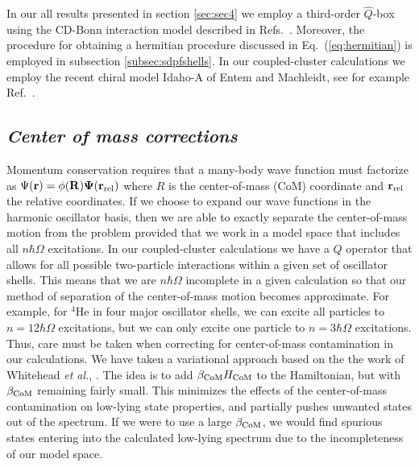 \documentclass{article}
\begin{document}
In our all results presented in section \ref{sec:sec4} we employ a 
third-order $\hat{Q}$-box using the CD-Bonn interaction model described in
Refs.~\cite{cdbonn,cdbonn2000}. Moreover, the procedure for obtaining a
hermitian procedure discussed in Eq.~(\ref{eq:hermitian}) is employed in
subsection \ref{subsec:sdpfshells}. In our coupled-cluster calculations we employ the 
recent chiral model Idaho-A of Entem and Machleidt, see for example Ref.~\cite{machleidt02}. 


\subsection{\it Center of mass corrections}

Momentum conservation requires 
that a many-body wave function must factorize
as $\Psi(\bf{r}) = \phi(R)\Psi(\bf{r}_{\rm rel})$ where 
$R$ is the center-of-mass (CoM) coordinate and $\bf{r}_{\rm rel}$ the 
relative coordinates. If we choose to expand our wave functions in
the harmonic oscillator basis, then we are able to exactly separate the
center-of-mass motion from the problem provided that we work in a model
space that includes all $n\hbar\Omega$ excitations. 
In our coupled-cluster calculations we have a $Q$ operator that allows 
for all possible two-particle interactions within a given 
set of oscillator shells.  This means that we are 
$n\hbar\Omega$ incomplete in a given 
calculation so that our method of separation of the center-of-mass 
motion becomes approximate. For example, for $^4$He in four major oscillator
shells, we can excite all particles to $n=12\hbar\Omega$ excitations, 
but we can only excite one particle to $n=3\hbar\Omega$ excitations. 
Thus, care must be taken when correcting for center-of-mass contamination
in our calculations. We have taken a variational approach based on the 
the work of Whitehead {\em et al.}, \cite{whit77}. The idea is 
to add $\beta_{\rm CoM}H_{\rm CoM}$ to the Hamiltonian, but 
with $\beta_{\rm CoM}$ remaining fairly
small. This minimizes the effects of the center-of-mass contamination on
low-lying state properties, and partially pushes unwanted states out of the
spectrum. If we were to use a large $\beta_{\rm CoM}$, we would find 
spurious states entering into the calculated low-lying spectrum due to 
the incompleteness of our model space. 
\end{document}
